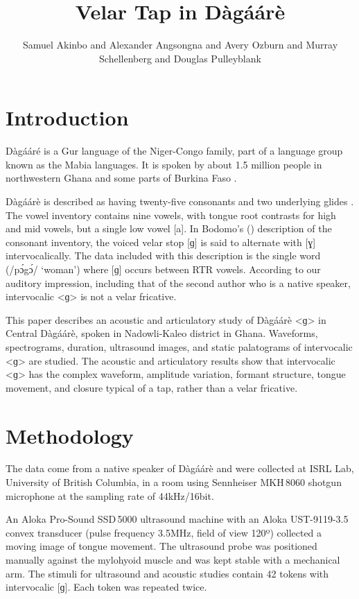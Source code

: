 \documentclass[output=paper, modfonts]{langscibook}
\title{Velar Tap in Dàgáárè}
\author{Samuel Akinbo\affiliation{University of British Columbia} and  Alexander Angsongna\affiliation{University of British Columbia} and Avery Ozburn\affiliation{University of British Columbia} and Murray Schellenberg\affiliation{University of British Columbia} and Douglas Pulleyblank\affiliation{University of British Columbia}}
\begin{document}
\graphicspath{{figures/}}
\maketitle

\section{Introduction} 
D\`ag\'a\'ar\'e is a Gur language of the Niger-Congo family, part of a language group known as the Mabia languages. It is spoken by about 1.5 million people in northwestern Ghana and some parts of Burkina Faso \citep{kennedy1966collected, bodomo1997}.

Dàgáárè is described as having twenty-five consonants and two underlying glides \citep{bodomo1997}. The vowel inventory contains nine vowels, with tongue root contrasts for high and mid vowels, but a single low vowel [a]. In Bodomo's (\citeyear{bodomo1997}) description of the consonant inventory, the voiced velar stop [ɡ] is said to alternate with [ɣ] intervocalically. The data included with this description is the single word (/p\'ɔg\'ɔ/ ‘woman’) where [ɡ] occurs between RTR vowels. According to our auditory impression, including that of the second author who is a native speaker, intervocalic <ɡ> is not a velar fricative.

This paper describes an acoustic and articulatory study of Dàgáárè <ɡ> in Central Dàgáárè, spoken in Nadowli-Kaleo district in Ghana. Waveforms, spectrograms, duration, ultrasound images, and static palatograms of intervocalic <ɡ> are studied. The acoustic and articulatory results show that intervocalic <ɡ> has the complex waveform, amplitude variation, formant structure, tongue movement, and closure typical of a tap, rather than a velar fricative.
 

\section{Methodology}
The data come from a native speaker of Dàgáárè and were collected at ISRL Lab, University of British Columbia, in a room using Sennheiser MKH\,8060 shotgun microphone at the sampling rate of 44kHz/16bit.

An Aloka Pro-Sound SSD\,5000 ultrasound machine with an Aloka UST-9119-3.5 convex transducer (pulse frequency 3.5MHz, field of view 120º) collected a moving image of tongue movement. The ultrasound probe was positioned manually against the mylohyoid muscle and was kept stable with a mechanical arm. The stimuli for ultrasound and acoustic studies contain 42 tokens with intervocalic [ɡ]. Each token was repeated twice.
\end{document}

